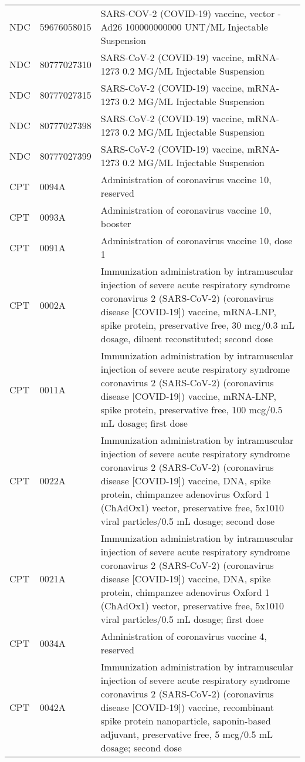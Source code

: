 \begin{longtable}{p{}p{}p{}}
  NDC & 59676058015 & SARS-COV-2 (COVID-19) vaccine, vector - Ad26 100000000000 UNT/ML Injectable Suspension \\ 
  NDC & 80777027310 & SARS-CoV-2 (COVID-19) vaccine, mRNA-1273 0.2 MG/ML Injectable Suspension \\ 
  NDC & 80777027315 & SARS-CoV-2 (COVID-19) vaccine, mRNA-1273 0.2 MG/ML Injectable Suspension \\ 
  NDC & 80777027398 & SARS-CoV-2 (COVID-19) vaccine, mRNA-1273 0.2 MG/ML Injectable Suspension \\ 
  NDC & 80777027399 & SARS-CoV-2 (COVID-19) vaccine, mRNA-1273 0.2 MG/ML Injectable Suspension \\ 
  CPT & 0094A & Administration of coronavirus vaccine 10, reserved \\ 
  CPT & 0093A & Administration of coronavirus vaccine 10, booster \\ 
  CPT & 0091A & Administration of coronavirus vaccine 10, dose 1 \\ 
  CPT & 0002A & Immunization administration by intramuscular injection of severe acute respiratory syndrome coronavirus 2 (SARS-CoV-2) (coronavirus disease [COVID-19]) vaccine, mRNA-LNP, spike protein, preservative free, 30 mcg/0.3 mL dosage, diluent reconstituted; second dose \\ 
  CPT & 0011A & Immunization administration by intramuscular injection of severe acute respiratory syndrome coronavirus 2 (SARS-CoV-2) (coronavirus disease [COVID-19]) vaccine, mRNA-LNP, spike protein, preservative free, 100 mcg/0.5 mL dosage; first dose \\ 
  CPT & 0022A & Immunization administration by intramuscular injection of severe acute respiratory syndrome coronavirus 2 (SARS-CoV-2) (coronavirus disease [COVID-19]) vaccine, DNA, spike protein, chimpanzee adenovirus Oxford 1 (ChAdOx1) vector, preservative free, 5x1010 viral particles/0.5 mL dosage; second dose \\ 
  CPT & 0021A & Immunization administration by intramuscular injection of severe acute respiratory syndrome coronavirus 2 (SARS-CoV-2) (coronavirus disease [COVID-19]) vaccine, DNA, spike protein, chimpanzee adenovirus Oxford 1 (ChAdOx1) vector, preservative free, 5x1010 viral particles/0.5 mL dosage; first dose \\ 
  CPT & 0034A & Administration of coronavirus vaccine 4, reserved \\ 
  CPT & 0042A & Immunization administration by intramuscular injection of severe acute respiratory syndrome coronavirus 2 (SARS-CoV-2) (coronavirus disease [COVID-19]) vaccine, recombinant spike protein nanoparticle, saponin-based adjuvant, preservative free, 5 mcg/0.5 mL dosage; second dose \\ 

\end{longtable}
